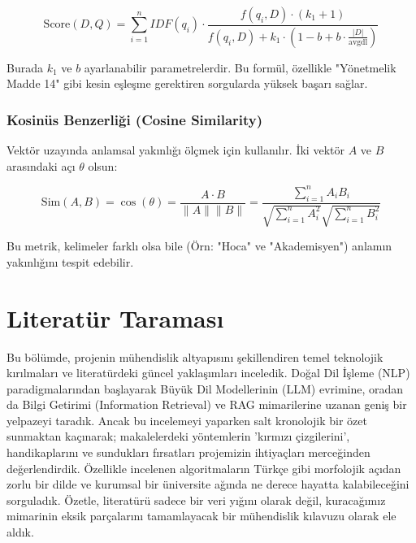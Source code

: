 \documentclass[12pt,a4paper]{report}
\begin{document}
\begin{equation}
    \text{Score}(D,Q) = \sum_{i=1}^{n} IDF(q_i) \cdot \frac{f(q_i, D) \cdot (k_1 + 1)}{f(q_i, D) + k_1 \cdot (1 - b + b \cdot \frac{|D|}{\text{avgdl}})}
\end{equation}

Burada $k_1$ ve $b$ ayarlanabilir parametrelerdir. Bu formül, özellikle "Yönetmelik Madde 14" gibi kesin eşleşme gerektiren sorgularda yüksek başarı sağlar.

\subsubsection{Kosinüs Benzerliği (Cosine Similarity)}
Vektör uzayında anlamsal yakınlığı ölçmek için kullanılır. İki vektör $A$ ve $B$ arasındaki açı $\theta$ olsun:

\begin{equation}
    \text{Sim}(A, B) = \cos(\theta) = \frac{A \cdot B}{\|A\| \|B\|} = \frac{\sum_{i=1}^{n} A_i B_i}{\sqrt{\sum_{i=1}^{n} A_i^2} \sqrt{\sum_{i=1}^{n} B_i^2}}
\end{equation}

Bu metrik, kelimeler farklı olsa bile (Örn: "Hoca" ve "Akademisyen") anlamın yakınlığını tespit edebilir.

\section{Literatür Taraması}

Bu bölümde, projenin mühendislik altyapısını şekillendiren temel teknolojik kırılmaları ve literatürdeki güncel yaklaşımları inceledik. Doğal Dil İşleme (NLP) paradigmalarından başlayarak Büyük Dil Modellerinin (LLM) evrimine, oradan da Bilgi Getirimi (Information Retrieval) ve RAG mimarilerine uzanan geniş bir yelpazeyi taradık. Ancak bu incelemeyi yaparken salt kronolojik bir özet sunmaktan kaçınarak; makalelerdeki yöntemlerin 'kırmızı çizgilerini', handikaplarını ve sundukları fırsatları projemizin ihtiyaçları merceğinden değerlendirdik. Özellikle incelenen algoritmaların Türkçe gibi morfolojik açıdan zorlu bir dilde ve kurumsal bir üniversite ağında ne derece hayatta kalabileceğini sorguladık. Özetle, literatürü sadece bir veri yığını olarak değil, kuracağımız mimarinin eksik parçalarını tamamlayacak bir mühendislik kılavuzu olarak ele aldık.
\end{document}

